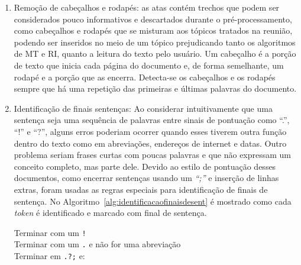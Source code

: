 \begin{enumerate}

\item Remoção de cabeçalhos e rodapés: as atas contém trechos que podem ser considerados pouco informativos e descartados durante o pré-processamento, como cabeçalhos e rodapés que se misturam aos tópicos tratados na reunião, podendo ser inseridos no meio de um tópico prejudicando tanto os algoritmos de MT e RI, quanto a leitura do texto pelo usuário. Um cabeçalho é a porção de texto que inicia cada página do documento e, de forma semelhante, um rodapé e a porção que as encerra. Detecta-se os cabeçalhos e os rodapés sempre que há uma repetição das primeiras e últimas palavras do documento.


\item Identificação de finais sentenças: Ao considerar intuitivamente que uma sentença seja uma sequência de palavras entre sinais de pontuação como ``.'', ``!'' e ``?'', alguns erros poderiam ocorrer quando esses tiverem outra função dentro do texto como em abreviações, endereços de internet e datas. Outro problema seriam frases curtas com poucas palavras e que não expressam um conceito completo, mas parte dele. Devido ao estilo de pontuação desses documentos, como encerrar sentenças usando um \textit{``;''} e inserção de linhas extras, foram usadas as regras especiais para identificação de finais de sentença. No Algoritmo~\ref{alg:identificacaofinaisdesent} é mostrado como cada \textit{token} é identificado e marcado com final de sentença.%



\begin{algorithm}

	
	
	 {	

	Terminar com um \texttt{!}\\
	Terminar com um \texttt{.} e não for uma abreviação\\
	Terminar em \texttt{.?;} e:
	}
	

\end{algorithm}
\end{enumerate}
